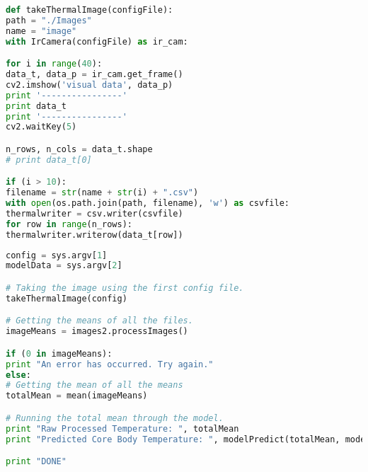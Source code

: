 \begin{lstlisting}[language=Python, caption=Prodiction Mode]
def takeThermalImage(configFile):
path = "./Images"
name = "image"
with IrCamera(configFile) as ir_cam:

for i in range(40):
data_t, data_p = ir_cam.get_frame()
cv2.imshow('visual data', data_p)
print '----------------'
print data_t
print '----------------'
cv2.waitKey(5)

n_rows, n_cols = data_t.shape
# print data_t[0]

if (i > 10):
filename = str(name + str(i) + ".csv")
with open(os.path.join(path, filename), 'w') as csvfile:
thermalwriter = csv.writer(csvfile)
for row in range(n_rows):
thermalwriter.writerow(data_t[row]) 
\end{lstlisting}


\begin{lstlisting}[language=Python, caption=Taking an image and returning the mean]
config = sys.argv[1]
modelData = sys.argv[2]

# Taking the image using the first config file.
takeThermalImage(config)

# Getting the means of all the files.
imageMeans = images2.processImages()

if (0 in imageMeans):
print "An error has occurred. Try again."
else:
# Getting the mean of all the means
totalMean = mean(imageMeans)

# Running the total mean through the model.
print "Raw Processed Temperature: ", totalMean
print "Predicted Core Body Temperature: ", modelPredict(totalMean, modelData)

print "DONE"
\end{lstlisting}

